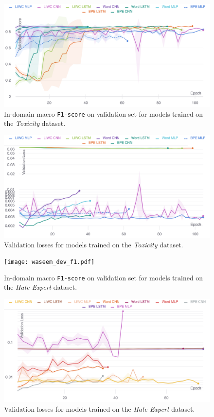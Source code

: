 \begin{figure}
    \centering
    \includegraphics[width=\textwidth]{wulczyn_dev_f1.pdf}
    \caption{In-domain macro \texttt{F1-score} on validation set for models trained on the \textit{Toxicity} dataset.}
    \label{fig:wulczyn_dev_f1}
\end{figure}
\begin{figure}
    \centering
    \includegraphics[width=\textwidth]{wulczyn_dev_loss_stderr_logscale.pdf}
    \caption{Validation losses for models trained on the \textit{Toxicity} dataset.}
    \label{fig:wulczyn_dev_loss}
\end{figure}

\begin{figure}
    \centering
    \texttt{[image: waseem\_dev\_f1.pdf]}
    \caption{In-domain macro \texttt{F1-score} on validation set for models trained on the \textit{Hate Expert} dataset.}
    \label{fig:waseem_dev_f1}
\end{figure}
\begin{figure}
    \centering
    \includegraphics[width=\textwidth]{waseem_dev_loss_stderr_logscale.pdf}
    \caption{Validation losses for models trained on the \textit{Hate Expert} dataset.}
    \label{fig:waseem_dev_loss}
\end{figure}

